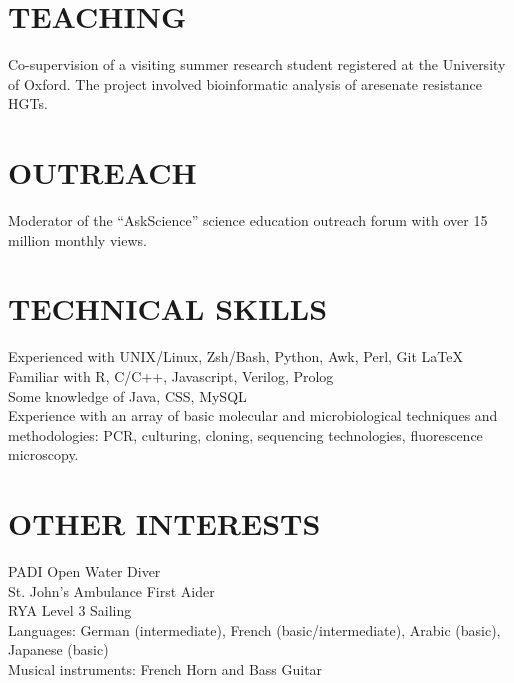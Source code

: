 \documentclass{res}
\begin{document}
\begin{resume}
 
  \section{TEACHING}
Co-supervision of a visiting summer research student registered at the University of Oxford. The project involved bioinformatic analysis of aresenate resistance HGTs. 

 \section{OUTREACH}          
Moderator of the ``AskScience'' science education outreach forum with over 15 million monthly views.

 \section{TECHNICAL SKILLS}
Experienced with UNIX/Linux, Zsh/Bash, Python, Awk, Perl, Git \LaTeX\\ 
Familiar with R, C/C++, Javascript, Verilog, Prolog\\
Some knowledge of Java, CSS, MySQL\\
Experience with an array of basic molecular and microbiological techniques and methodologies: PCR, culturing, cloning, sequencing technologies, fluorescence microscopy.

	
 \section{OTHER INTERESTS}
PADI Open Water Diver\\
St. John's Ambulance First Aider\\
RYA Level 3 Sailing\\
Languages: German (intermediate), French (basic/intermediate), Arabic (basic), Japanese (basic)\\
Musical instruments: French Horn and Bass Guitar\\

\end{resume}
\end{document}
